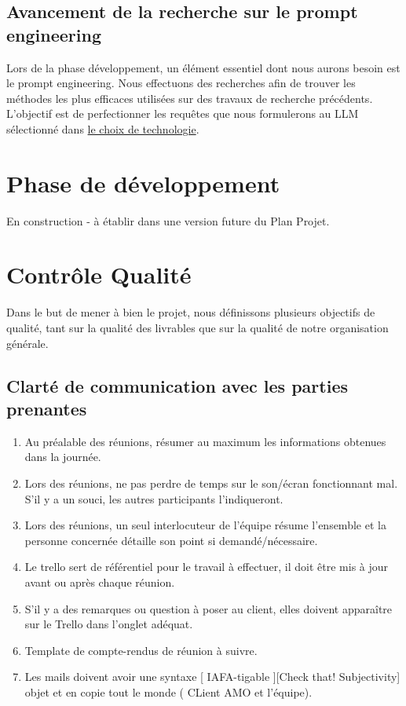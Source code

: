 \documentclass[11pt]{rapport_class}
\begin{document}
\section{Avancement de la recherche sur le prompt engineering}
\qquad Lors de la phase développement, un élément essentiel dont nous aurons besoin est le prompt engineering. Nous effectuons des recherches afin de trouver les méthodes les plus efficaces utilisées sur des travaux de recherche précédents. L'objectif est de perfectionner les requêtes que nous formulerons au LLM sélectionné dans \href{https://github.com/fghjklm/Projet_M1_CheckThat-/tree/main/choix_techno}{le choix de technologie}.




\chapter{Phase de développement}
\centerline{En construction - à établir dans une version future du Plan Projet.}




\chapter{Contrôle Qualité}
\label{Controle}
\qquad Dans le but de mener à bien le projet, nous définissons plusieurs objectifs de qualité, tant sur la qualité des livrables que sur la qualité de notre organisation générale. 

\section{Clarté de communication avec les parties prenantes}
\begin{enumerate}
    \item Au préalable des réunions, résumer au maximum les informations obtenues dans la journée.
    \item Lors des réunions, ne pas perdre de temps sur le son/écran fonctionnant mal. S'il y a un souci, les autres participants l'indiqueront.
    \item Lors des réunions, un seul interlocuteur de l'équipe résume l'ensemble et la personne concernée détaille son point si demandé/nécessaire.
    \item Le trello sert de référentiel pour le travail à effectuer, il doit être mis à jour avant ou après chaque réunion.
    \item S'il y a des remarques ou question à poser au client, elles doivent apparaître sur le Trello dans l'onglet adéquat.
    \item Template de compte-rendus de réunion à suivre.
    \item Les mails doivent avoir une syntaxe [ IAFA-tigable ][Check that! Subjectivity] objet et en copie tout le monde ( CLient AMO et l'équipe).
\end{enumerate}
\end{document}
